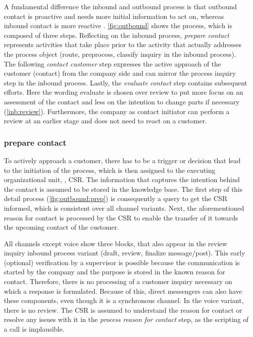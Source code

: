 	 
	 A fundamental difference the inbound and outbound process is that outbound contact is proactive and needs more initial information to act on, whereas inbound contact is more reactive \citep{DimensionData2015}. \Fig \ref{fig:outbound} shows the process, which is composed of three steps. Reflecting on the inbound process,  \textit{prepare contact} represents activities that take place prior to the activity that actually addresses the process object (route, preprocess, classify inquiry in the inbound process). The following \textit{contact customer} step expresses the active approach of the customer (contact) from the company side and can mirror the process inquiry step in the inbound process. Lastly, the \textit{evaluate contact} step contains subsequent efforts. Here the wording evaluate is chosen over review to put more focus on an assessment of the contact and less on the intention to change parts if necessary (\cf \ref{inb:review}). Furthermore, the company as contact initiator can perform a review at an earlier stage and does not need to react on a customer. 
	 
	 
	 \subsubsection{prepare contact}
	 
	 To actively approach a customer, there has to be a trigger or decision that lead to the initiation of the process, which is then assigned to the executing organizational unit, \eg, \acrshort{CSR}. The information that captures the intention behind the contact is assumed to be stored in the knowledge base. The first step of this detail process (\Fig \ref{fig:outbound:prep}) is consequently a query to get the \acrshort{CSR} informed, which is consistent over all channel variants. Next, the aforementioned reason for contact is processed by the \acrshort{CSR} to enable the transfer of it towards the upcoming contact of the customer. 
	 
	 All channels except voice show three blocks, that also appear in the review inquiry inbound process variant (draft, review, finalize message/post). This early (optional) verification by a supervisor is possible because the communication is started by the company and the purpose is stored in the known reason for contact. Therefore, there is no processing of a customer inquiry necessary on which a response is formulated. Because of this, direct messengers can also have these components, even though it is a synchronous channel. In the voice variant, there is no review. The \acrshort{CSR} is assumed to understand the reason for contact or resolve any issues with it in the \textit{process reason for contact} step, as the scripting of a call is implausible. 
	 
